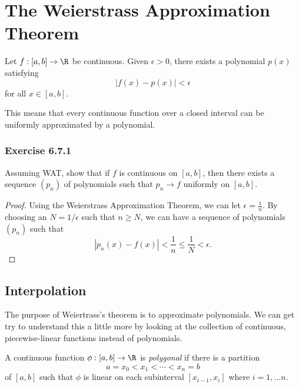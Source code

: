 \section{The Weierstrass Approximation Theorem}

\begin{tcolorbox}
    \begin{thm}
        Let \( f: [a,b] \to \R  \) be continuous. Given \( \epsilon > 0  \), there exists a polynomial \( p(x) \) satisfying 
        \[  | f(x) - p(x) | < \epsilon \] for all \( x \in [a,b] \).
    \end{thm}
\end{tcolorbox}

This means that every continuous function over a closed interval can be uniformly approximated by a polynomial.

\subsubsection{Exercise 6.7.1} Assuming WAT, show that if \( f \) is continuous on \( [a,b] \), then there exists a sequence \( (p_n) \) of polynomials such that \( p_n \to f  \) uniformly on \( [a,b] \).

\begin{proof}
    Using the Weierstrass Approximation Theorem, we can let \( \epsilon  = \frac{ 1 }{ n }  \). By choosing an \( N = 1 / \epsilon   \) such that \( n \geq N  \), we can have a sequence of polynomials \( (p_n) \) such that 
    \[ | p_{n}(x) - f(x)  | < \frac{ 1 }{ n  } \leq \frac{ 1 }{ N } < \epsilon.  \]
\end{proof}

\subsection{Interpolation}

The purpose of Weiertrass's theorem is to approximate polynomials. We can get try to understand this a little more by looking at the collection of continuous, piecewise-linear functions instead of polynomials.

\begin{tcolorbox}
\begin{defn}
    A continuous function \( \phi : [a,b] \to \R  \) is \textit{polygonal} if there is a partition 
    \[  a = x_{0} < x_{1} < \dotsb < x_{n} = b   \] of \( [a,b] \) such that \( \phi  \) is linear on each subinterval \( [x_{i-1}, x_{i}] \) where \(  i = 1, \dots n. \)
\end{defn}
\end{tcolorbox}

